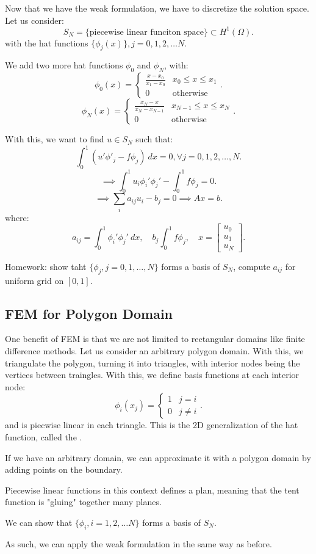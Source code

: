 \documentclass[../main/main.tex]{subfiles}
\begin{document}
Now that we have the weak formulation, we have to discretize the solution space. Let us consider: \[
    S_N = \{\text{piecewise linear funciton space}\}  \subset H^1(\Omega)
.\] with the hat functions $ \{\phi_j(x)\}, j=0,1,2,\ldots N $. 
\begin{remark}
    We add two more hat functions $\phi_0$ and $\phi_N$, with:  \[
        \phi_0(x) = \begin{cases}
            \frac{x-x_0}{x_1-x_0} & x_0 \le  x \le  x_1\\
            0 &\text{otherwise}
        \end{cases}
    .\] \[ 
        \phi_N(x) = \begin{cases}
            \frac{x_N-x}{x_N-x_{N-1}} & x_{N-1} \le  x \le  x_{N}\\
            0 &\text{otherwise}
        \end{cases}
    .\] 
\end{remark}
With this, we want to find $u \in S_N$ such that: \[
    \int^1_0(u'\phi'_j - f \phi_j)~dx = 0, \forall j = 0,1,2,\ldots,N
.\] \[
\implies
\int^1_0 u_i \phi_i'\phi_j' - \int^1_0 f\phi_j = 0 
.\] \[
\implies \sum_i a_{ij}u_i - b_j = 0 \implies Ax = b
.\] where: \[
a_{ij} = \int^1_0 \phi_i' \phi_j' ~dx,\quad b_j\int^1_0 f\phi_j, \quad x = \begin{bmatrix} u_0\\u_1\\u_{N} \end{bmatrix} 
.\] 
\begin{remark}
    Homework: show taht $ \{\phi_j, j=0,1,\ldots,N\} $ forms a basis of $S_N$, compute $a _{ij}$ for uniform grid on $[0,1]$.
\end{remark}
\subsection{FEM for Polygon Domain}
One benefit of FEM is that we are not limited to rectangular domains like finite difference methods. Let us consider an arbitrary polygon domain. With this, we triangulate the polygon, turning it into triangles, with interior nodes being the vertices between traingles. With this, we define basis functions at each interior node: \[
    \phi_i(x_j) = \begin{cases}
        1 & j = i\\
        0 & j \neq i
    \end{cases}
.\] and is piecwise linear in each triangle. This is the 2D generalization of the hat function, called the .
\begin{remark}
    If we have an arbitrary domain, we can approximate it with a polygon domain by adding points on the boundary.
\end{remark}
\begin{remark}
    Piecewise linear functions in this context defines a plan, meaning that the tent function is "gluing" together many planes.
\end{remark}
\begin{remark}
    We can show that $\{\phi_i,i=1,2,\ldots N\} $ forms a basis of $S_N$. 
\end{remark}
As such, we can apply the weak formulation in the same way as before. 
\end{document}
